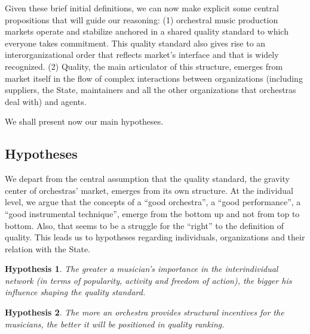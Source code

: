 \documentclass[a4paper, 12pt, openright, oneside, german, french, brazil, english, article]{abntex2}
\begin{document}
	Given these brief initial definitions, we can now make explicit some central propositions that will guide our reasoning: (1) orchestral music production markets operate and stabilize anchored in a shared quality standard to which everyone takes commitment. This quality standard also gives rise to an interorganizational order that reflects market's interface and that is widely recognized. (2) Quality, the main articulator of this structure, emerges from market itself in the flow of complex interactions between organizations (including suppliers, the State, maintainers and all the other organizations that orchestras deal with) and agents.
	
	
	We shall present now our main hypotheses.
	
	
	\subsection{Hypotheses}
	\newtheorem{hip}{Hypothesis}
	
	We depart from the central assumption that the quality standard, the gravity center of orchestras' market, emerges from its own structure. At the individual level, we argue that the concepts of a ``good orchestra'', a ``good performance'', a ``good instrumental technique'', emerge from the bottom up and not from top to bottom. Also, that seems to be a struggle for the ``right'' to the definition of quality. This leads us to hypotheses regarding individuals, organizations and their relation with the State.
	
	\begin{hip}
		The greater a musician's importance in the interindividual network (in terms of popularity, activity and freedom of action), the bigger his influence shaping the quality standard.
	\end{hip}
	
	
	
	\begin{hip}
		The more an orchestra provides structural incentives for the musicians, the better it will be positioned in quality ranking.
	\end{hip}
	
\end{document}
